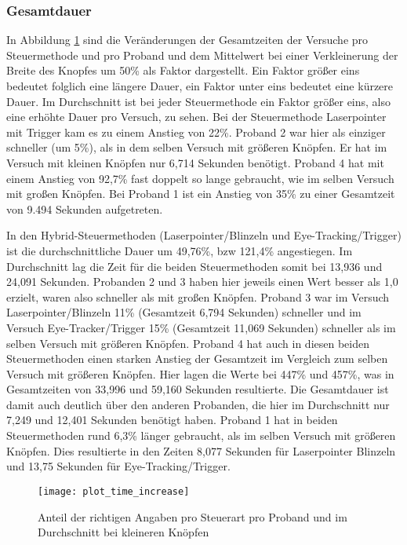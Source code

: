 \subsubsection{Gesamtdauer}
In Abbildung \ref{fig:timesIncrease} sind die Veränderungen der Gesamtzeiten der Versuche pro Steuermethode und pro Proband und dem Mittelwert bei einer Verkleinerung der Breite des Knopfes um 50\% als Faktor dargestellt. Ein Faktor größer eins bedeutet folglich eine längere Dauer, ein Faktor unter eins bedeutet eine kürzere Dauer. Im Durchschnitt ist bei jeder Steuermethode ein Faktor größer eins, also eine erhöhte Dauer pro Versuch, zu sehen. Bei der Steuermethode Laserpointer mit Trigger kam es zu einem Anstieg von 22\%. Proband 2 war hier als einziger schneller (um 5\%), als in dem selben Versuch mit größeren Knöpfen. Er hat im Versuch mit kleinen Knöpfen nur 6,714 Sekunden benötigt. Proband 4 hat mit einem Anstieg von 92,7\% fast doppelt so lange gebraucht, wie im selben Versuch mit großen Knöpfen. Bei Proband 1 ist ein Anstieg von 35\% zu einer Gesamtzeit von 9.494 Sekunden aufgetreten.

In den Hybrid-Steuermethoden (Laserpointer/Blinzeln und Eye-Tracking/Trigger) ist die durchschnittliche Dauer um 49,76\%, bzw 121,4\% angestiegen. Im Durchschnitt lag die Zeit für die beiden Steuermethoden somit bei 13,936  und 24,091 Sekunden. Probanden 2 und 3 haben hier jeweils einen Wert besser als 1,0 erzielt, waren also schneller als mit großen Knöpfen. Proband 3 war im Versuch Laserpointer/Blinzeln 11\% (Gesamtzeit 6,794 Sekunden) schneller und im Versuch Eye-Tracker/Trigger 15\% (Gesamtzeit 11,069 Sekunden) schneller als im selben Versuch mit größeren Knöpfen. Proband 4 hat auch in diesen beiden Steuermethoden einen starken Anstieg der Gesamtzeit im Vergleich zum selben Versuch mit größeren Knöpfen. Hier lagen die Werte bei 447\% und 457\%, was in Gesamtzeiten von 33,996 und 59,160 Sekunden resultierte. Die Gesamtdauer ist damit auch deutlich über den anderen Probanden, die hier im Durchschnitt nur 7,249 und 12,401 Sekunden benötigt haben. Proband 1 hat in beiden Steuermethoden rund 6,3\% länger gebraucht, als im selben Versuch mit größeren Knöpfen. Dies resultierte in den Zeiten 8,077 Sekunden für Laserpointer Blinzeln und 13,75 Sekunden für Eye-Tracking/Trigger.

\begin{figure}[!htbp]
	\centering
	\texttt{[image: plot\_time\_increase]}
	\caption[Anteil der richtigen Angaben pro Steuerart pro Proband und im Durchschnitt bei kleineren Knöpfen]{Anteil der richtigen Angaben pro Steuerart pro Proband und im Durchschnitt bei kleineren Knöpfen}
	\label{fig:timesIncrease}
\end{figure}

